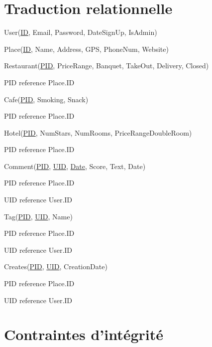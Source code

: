\documentclass[a4paper,10pt]{article}
\begin{document}


\section{Traduction relationnelle}

\noindent User(\underline{ID}, Email, Password, DateSignUp, IsAdmin)

\hspace{-0,5cm}Place(\underline{ID}, Name, Address, GPS, PhoneNum, Website)

\hspace{-0,5cm}Restaurant(\underline{PID}, PriceRange, Banquet, TakeOut, Delivery, Closed)

PID reference Place.ID

\hspace{-0,5cm}Cafe(\underline{PID}, Smoking, Snack)

PID reference Place.ID

\hspace{-0,5cm}Hotel(\underline{PID}, NumStars, NumRooms, PriceRangeDoubleRoom)

PID reference Place.ID

\hspace{-0,5cm}Comment(\underline{PID}, \underline{UID}, \underline{Date}, Score, Text, Date)

PID reference Place.ID

UID reference User.ID

\hspace{-0,5cm}Tag(\underline{PID}, \underline{UID}, Name)

PID reference Place.ID

UID reference User.ID

\hspace{-0,5cm}Creates(\underline{PID}, \underline{UID}, CreationDate)

PID reference Place.ID

UID reference User.ID

\section{Contraintes d'intégrité}
\end{document}
